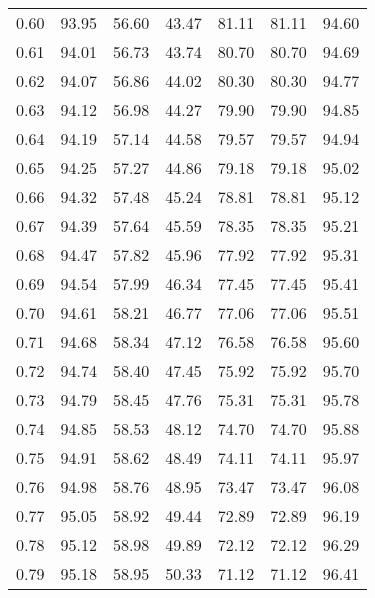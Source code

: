 \begin{tabular}{|c|c|c|c|c|c|c|}
      0.60 &     93.95 &     56.60 &      43.47 &   81.11 &      81.11 &         94.60 \\
      0.61 &     94.01 &     56.73 &      43.74 &   80.70 &      80.70 &         94.69 \\
      0.62 &     94.07 &     56.86 &      44.02 &   80.30 &      80.30 &         94.77 \\
      0.63 &     94.12 &     56.98 &      44.27 &   79.90 &      79.90 &         94.85 \\
      0.64 &     94.19 &     57.14 &      44.58 &   79.57 &      79.57 &         94.94 \\
      0.65 &     94.25 &     57.27 &      44.86 &   79.18 &      79.18 &         95.02 \\
      0.66 &     94.32 &     57.48 &      45.24 &   78.81 &      78.81 &         95.12 \\
      0.67 &     94.39 &     57.64 &      45.59 &   78.35 &      78.35 &         95.21 \\
      0.68 &     94.47 &     57.82 &      45.96 &   77.92 &      77.92 &         95.31 \\
      0.69 &     94.54 &     57.99 &      46.34 &   77.45 &      77.45 &         95.41 \\
      0.70 &     94.61 &     58.21 &      46.77 &   77.06 &      77.06 &         95.51 \\
      0.71 &     94.68 &     58.34 &      47.12 &   76.58 &      76.58 &         95.60 \\
      0.72 &     94.74 &     58.40 &      47.45 &   75.92 &      75.92 &         95.70 \\
      0.73 &     94.79 &     58.45 &      47.76 &   75.31 &      75.31 &         95.78 \\
      0.74 &     94.85 &     58.53 &      48.12 &   74.70 &      74.70 &         95.88 \\
      0.75 &     94.91 &     58.62 &      48.49 &   74.11 &      74.11 &         95.97 \\
      0.76 &     94.98 &     58.76 &      48.95 &   73.47 &      73.47 &         96.08 \\
      0.77 &     95.05 &     58.92 &      49.44 &   72.89 &      72.89 &         96.19 \\
      0.78 &     95.12 &     58.98 &      49.89 &   72.12 &      72.12 &         96.29 \\
      0.79 &     95.18 &     58.95 &      50.33 &   71.12 &      71.12 &         96.41 \\

\end{tabular}
